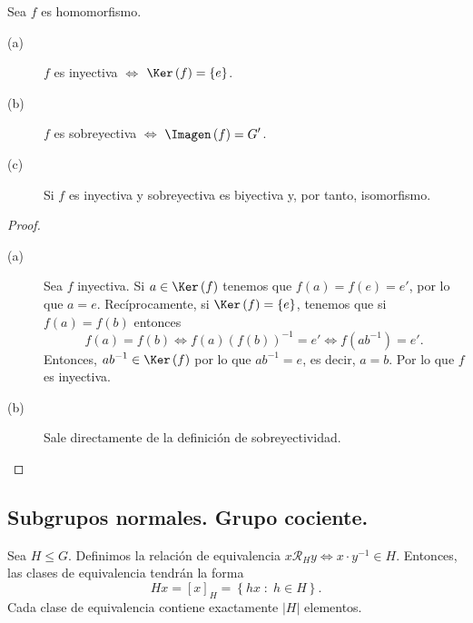 \begin{fprop}[]
\normalfont Sea $\displaystyle f $ es homomorfismo.
\begin{description}
	\item[(a)]  $\displaystyle f $ es inyectiva $\displaystyle \iff  $ $\displaystyle \Ker\left(f\right) = \left\{ e\right\}  $.
	\item[(b)] $\displaystyle f $ es sobreyectiva $\displaystyle \iff  $ $\displaystyle \Imagen\left(f\right) = G' $.
	\item[(c)] Si $\displaystyle f $ es inyectiva y sobreyectiva es biyectiva y, por tanto, isomorfismo.
\end{description}
\end{fprop}

\begin{proof}
\begin{description}
	\item[(a)] Sea $\displaystyle f $ inyectiva. Si $\displaystyle a \in \Ker\left(f\right) $ tenemos que $\displaystyle f\left(a\right) = f\left(e\right) = e' $, por lo que $\displaystyle a = e $. Recíprocamente, si $\displaystyle \Ker\left(f\right) = \left\{ e\right\}  $, tenemos que si $\displaystyle f\left(a\right) = f\left(b\right) $ entonces
	\[ f\left(a\right) = f\left(b\right) \iff f\left(a\right)\left(f\left(b\right)\right)^{-1} = e' \iff f\left(ab^{-1}\right) = e' .\]
Entonces, $\displaystyle ab^{-1} \in \Ker\left(f\right) $ por lo que $\displaystyle ab^{-1} = e $, es decir, $\displaystyle a = b $. Por lo que $\displaystyle f $ es inyectiva.
\item[(b)] Sale directamente de la definición de sobreyectividad.
\end{description}

\end{proof}

\subsection{Subgrupos normales. Grupo cociente.}

\begin{fdefinition}[]
\normalfont Sea $\displaystyle H \leq G $. Definimos la relación de equivalencia $\displaystyle x \mathcal{R}_{H} y \iff x \cdot y^{-1} \in H $. Entonces, las clases de equivalencia tendrán la forma
\[Hx = \left[x\right] _{H} = \left\{ hx \; : \; h \in H\right\}  .\]
Cada clase de equivalencia contiene exactamente $\displaystyle \left|H\right| $ elementos.
\end{fdefinition}

